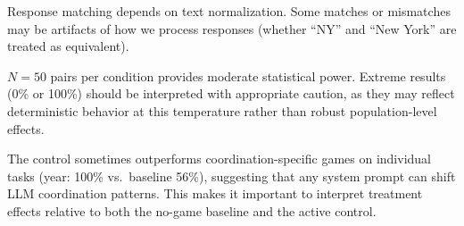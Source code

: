 Response matching depends on text normalization.
Some matches or mismatches may be artifacts of how we process responses (\eg whether ``NY'' and ``New York'' are treated as equivalent).

$N{=}50$ pairs per condition provides moderate statistical power.
Extreme results (0\% or 100\%) should be interpreted with appropriate caution, as they may reflect deterministic behavior at this temperature rather than robust population-level effects.

The \trivia control sometimes outperforms coordination-specific games on individual tasks (\eg year: 100\% vs.\ baseline 56\%), suggesting that any system prompt can shift LLM coordination patterns.
This makes it important to interpret treatment effects relative to both the no-game baseline and the active control.
